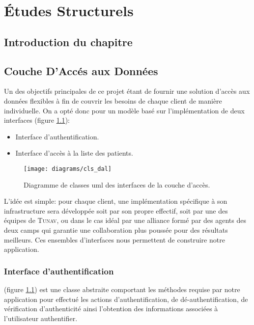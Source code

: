 
\chapter{Études Structurels}

\section{Introduction du chapitre}

\section[Couche d'Accès aux Données]{Couche D'Accés aux Données}

Un des objectifs principales de ce projet étant de fournir une solution
d’accès aux données flexibles à fin de couvrir les besoins de chaque
client de manière individuelle. On a opté donc pour un modèle basé sur
l’implémentation de deux interfaces (figure \ref{fig:cls_dal}):

\begin{itemize}

\item Interface d'authentification.

\item Interface d’accès à la liste des patients.

\end{itemize}

\begin{figure}
\center
\texttt{[image: diagrams/cls\_dal]}
\caption{Diagramme de classes \gls{uml} des interfaces de la couche d’accès.}
\label{fig:cls_dal}
\end{figure}

L'idée est simple: pour chaque client, une implémentation spécifique à son infrastructure sera développée soit par son propre effectif, soit par une des équipes de \textsc{Tunav}, ou dans le cas idéal par une alliance formé par des agents des deux camps qui garantie une collaboration plus poussée pour des résultats meilleurs.
Ces ensembles d'interfaces nous permettent de construire notre application.

\subsection{Interface d'authentification}

 (figure
\ref{fig:cls_dal}) est une classe abstraite comportant les méthodes
requise par notre application pour effectué les actions
d'authentification, de dé-authentification, de vérification
d'authenticité ainsi l'obtention des informations associées à l'utilisateur
authentifier.

